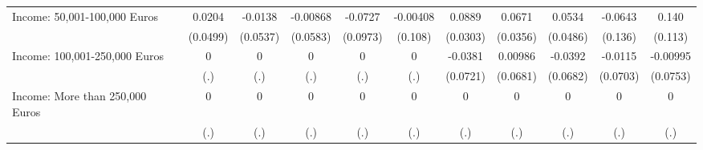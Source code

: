 {\begin{tabular}{l*{10}{c}}
Income: 50,001-100,000 Euros&      0.0204         &     -0.0138         &    -0.00868         &     -0.0727         &    -0.00408         &      0.0889\sym{**} &      0.0671         &      0.0534         &     -0.0643         &       0.140         \\
            &    (0.0499)         &    (0.0537)         &    (0.0583)         &    (0.0973)         &     (0.108)         &    (0.0303)         &    (0.0356)         &    (0.0486)         &     (0.136)         &     (0.113)         \\
\addlinespace
Income: 100,001-250,000 Euros&           0         &           0         &           0         &           0         &           0         &     -0.0381         &     0.00986         &     -0.0392         &     -0.0115         &    -0.00995         \\
            &         (.)         &         (.)         &         (.)         &         (.)         &         (.)         &    (0.0721)         &    (0.0681)         &    (0.0682)         &    (0.0703)         &    (0.0753)         \\
\addlinespace
Income: More than 250,000 Euros&           0         &           0         &           0         &           0         &           0         &           0         &           0         &           0         &           0         &           0         \\
            &         (.)         &         (.)         &         (.)         &         (.)         &         (.)         &         (.)         &         (.)         &         (.)         &         (.)         &         (.)         \\
\bottomrule
\end{tabular}
}
